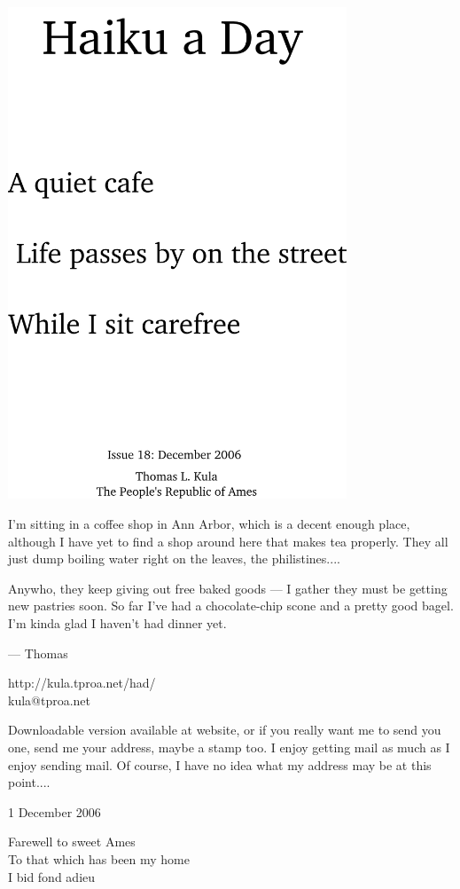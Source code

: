 \documentclass[12pt]{article}
\begin{document}
\includegraphics[width=101mm]{frontpage.png}

\newpage

I'm sitting in a coffee shop in Ann Arbor, which
is a decent enough place, although I have yet to find
a shop around here that makes tea properly. They all
just dump boiling water right on the leaves, the
philistines....

Anywho, they keep giving out free baked goods ---
I gather they must be getting new pastries soon.
So far I've had a chocolate-chip scone and a pretty
good bagel. I'm kinda glad I haven't had dinner yet.


--- Thomas

http://kula.tproa.net/had/ \\
kula@tproa.net

Downloadable version available at website, or if you really
want me to send you one, send me your address, maybe a
stamp too. I enjoy getting mail as much as I enjoy sending
mail. Of course, I have no idea what my address may be at
this point....

\setlength{\parskip}{1mm}

1 December 2006

Farewell to sweet Ames \\
To that which has been my home \\
I bid fond adieu 
\end{document}
